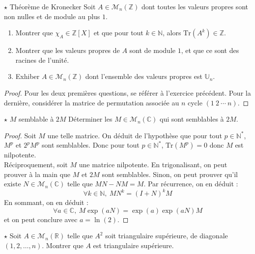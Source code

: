 \documentclass[french,a4paper]{article}
\newcommand{\N}{\mathbb{N}}
\newcommand{\Z}{\mathbb{Z}}
\newcommand{\R}{\mathbb{R}}
\newcommand{\C}{\mathbb{C}}
\newcommand{\U}{\mathbb{U}}
\newcommand{\st}{^*}
\newcommand{\Tr}{\text{Tr}}
\theoremstyle{plain}
\theoremstyle{definition}
\theoremstyle{remark}
\begin{document}
\begin{ex}[Châteaux]{$\star$ Théorème de Kronecker}
	Soit $A\in\mathcal{M}_n(\Z)$ dont toutes les valeurs propres sont non nulles et de module au plus $1$.
	\begin{enumerate}
		\item Montrer que $\chi_A\in\Z[X]$ et que pour tout $k\in\N$, alors $\Tr(A^k)\in\Z$.
		\item Montrer que les valeurs propres de $A$ sont de module $1$, et que ce sont des racines de l'unité.
		\item Exhiber $A\in\mathcal{M}_n(\Z)$ dont l'ensemble des valeurs propres est $\U_n$.
	\end{enumerate}
\end{ex}
\begin{proof}
	Pour les deux premières questions, se référer à l'exercice précédent. Pour la dernière, considérer la matrice de permutation associée au $n$ cycle $(1\ 2\ \cdots\ n)$.
\end{proof}

\begin{ex}[Châteaux]{$\star$ $M$ semblable à $2M$}
	Déterminer les $M\in\mathcal{M}_n(\C)$ qui sont semblables à $2M$.
\end{ex}
\begin{proof}
	Soit $M$ une telle matrice. On déduit de l'hypothèse que pour tout $p\in\N\st$, $M^p$ et $2^pM^p$ sont semblables. Donc pour tout $p\in\N\st$, $\Tr(M^p)=0$ donc $M$ est nilpotente. \\ Réciproquement, soit $M$ une matrice nilpotente. En trigonalisant, on peut prouver à la main que $M$ et $2M$ sont semblables. Sinon, on peut prouver qu'il existe $N\in\mathcal{M}_n(\C)$ telle que $MN-NM=M$. Par récurrence, on en déduit : $$\forall k\in\N,\ MN^k=(I+N)^kM$$ En sommant, on en déduit : $$\forall a\in\C,\ M\exp(aN)=\exp(a)\exp(aN)M$$ et on peut conclure avec $a=\ln(2)$.
\end{proof}

\begin{ex}[Châteaux]{$\star$}
	Soit $A\in\mathcal{M}_n(\R)$ telle que $A^2$ soit triangulaire supérieure, de diagonale $(1,2,\ldots,n)$. Montrer que $A$ est triangulaire supérieure.
\end{ex}
\end{document}
